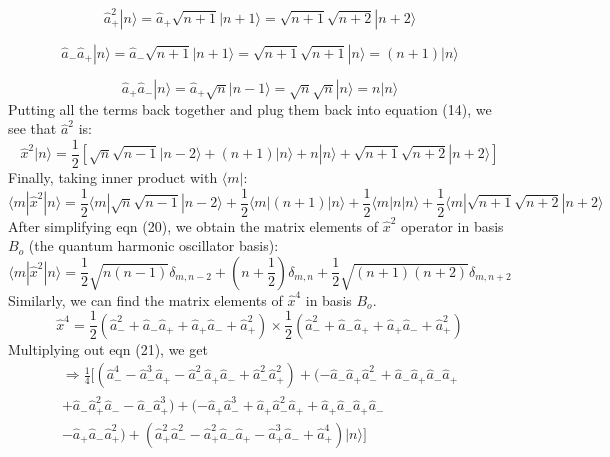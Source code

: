 \documentclass[]{article}
\begin{document}
\begin{equation}
\hat{a}_{+}^2|n\rangle 
= \hat{a}_{+}{\sqrt{n+1}|n+1\rangle}
= \sqrt{n+1}\sqrt{n+2}|n+2\rangle 
\end{equation}


\begin{equation}
	\hat{a}_{-}\hat{a}_+ |n\rangle 
= \hat{a}_{-} {\sqrt{n+1}|n+1\rangle}
= \sqrt{n+1}\sqrt{n+1}|n\rangle 
= (n+1)|n\rangle 
\end{equation}

\begin{equation}
		\hat{a}_{+}\hat{a}_- |n\rangle 
		= \hat{a}_{+} {\sqrt{n}|n-1\rangle}
		= \sqrt{n}\sqrt{n}|n\rangle 
		= n|n\rangle 
\end{equation}
Putting all the terms back together and plug them back into equation (14), we see that $\hat{a}^2$ is:
\begin{equation}
\hat{x}^2|n\rangle 
= \frac{1}{2}[ \sqrt{n}\sqrt{n-1}|n-2\rangle  +  (n+1)|n\rangle   +  n|n\rangle  +  \sqrt{n+1}\sqrt{n+2}|n+2\rangle   ]
\end{equation}
Finally, taking inner product with $\langle m|$:
\begin{equation}
\langle m| \hat{x}^2 |n\rangle 
= \frac{1}{2} \langle m| \sqrt{n}\sqrt{n-1}|n-2\rangle  +  \frac{1}{2} \langle m| (n+1)|n\rangle +  \frac{1}{2}\langle m| n|n\rangle  +  \frac{1}{2}\langle m| \sqrt{n+1}\sqrt{n+2}|n+2\rangle 
\end{equation}
After simplifying eqn (20), we obtain the matrix elements of $\hat{x}^2$ operator in basis $B_o$ (the quantum harmonic oscillator basis):
\begin{equation}
\langle m| \hat{x}^2 |n\rangle 
=  \frac{1}{2}\sqrt{n(n-1)} \delta_{m,n-2} +(n+\frac{1}{2})\delta_{m,n}+ \frac{1}{2}\sqrt{(n+1)(n+2)} \delta_{m,n+2}
\end{equation}
Similarly, we can find the matrix elements of $\hat{x}^4$ in basis $B_o$. 
\begin{equation}
\hat{x}^4 = \frac{1}{2}(\hat{a}_{-}^2 + \hat{a}_{-}\hat{a}_{+} + \hat{a}_{+}\hat{a}_{-} + \hat{a}_{+}^2) \times \frac{1}{2}(\hat{a}_{-}^2 + \hat{a}_{-}\hat{a}_{+} + \hat{a}_{+}\hat{a}_{-} + \hat{a}_{+}^2)
\end{equation}
Multiplying out eqn (21), we get 
\begin{equation}
\begin{aligned}
	\Rightarrow \frac{1}{4}\lbrack (\hat{a}_{-}^4 - \hat{a}_{-}^3\hat{a}_{+}- \hat{a}_{-}^2\hat{a}_{+}\hat{a}_{-}+ \hat{a}_{-}^2\hat{a}_{+}^2)
	 +(-\hat{a}_{-}\hat{a}_{+}\hat{a}_{-}^2 + \hat{a}_{-}\hat{a}_{+}\hat{a}_{-}\hat{a}_{+} \\+\hat{a}_{-}\hat{a}_{+}^2\hat{a}_{-} - \hat{a}_{-}\hat{a}_{+}^3) + (-\hat{a}_{+}\hat{a}_{-}^3 + \hat{a}_{+}\hat{a}_{-}^2\hat{a}_{+} + \hat{a}_{+}\hat{a}_{-}\hat{a}_{+}\hat{a}_{-} \\- \hat{a}_{+}\hat{a}_{-}\hat{a}_{+}^2) 
	+(\hat{a}_{+}^2\hat{a}_{-}^2-\hat{a}_{+}^2\hat{a}_{-}\hat{a}_{+} - \hat{a}_{+}^3\hat{a}_{-} + \hat{a}_{+}^4) | n \rangle  \rbrack
\end{aligned}
\end{equation}
\end{document}
